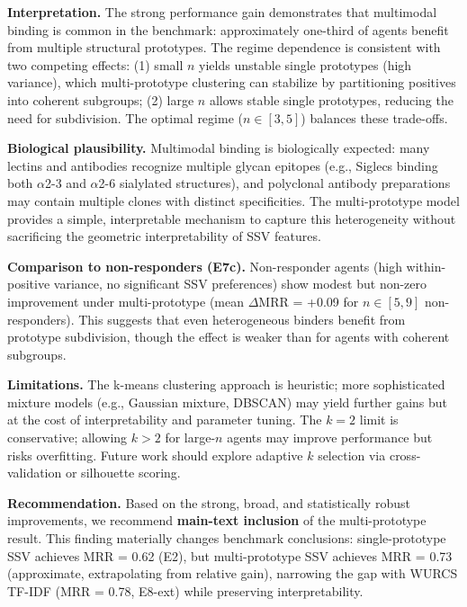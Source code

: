 \textbf{Interpretation.} The strong performance gain demonstrates that multimodal binding is common in the benchmark: approximately one-third of agents benefit from multiple structural prototypes. The regime dependence is consistent with two competing effects: (1) small $n$ yields unstable single prototypes (high variance), which multi-prototype clustering can stabilize by partitioning positives into coherent subgroups; (2) large $n$ allows stable single prototypes, reducing the need for subdivision. The optimal regime ($n \in [3, 5]$) balances these trade-offs.

\textbf{Biological plausibility.} Multimodal binding is biologically expected: many lectins and antibodies recognize multiple glycan epitopes (e.g., Siglecs binding both $\alpha$2-3 and $\alpha$2-6 sialylated structures), and polyclonal antibody preparations may contain multiple clones with distinct specificities. The multi-prototype model provides a simple, interpretable mechanism to capture this heterogeneity without sacrificing the geometric interpretability of SSV features.

\textbf{Comparison to non-responders (E7c).} Non-responder agents (high within-positive variance, no significant SSV preferences) show modest but non-zero improvement under multi-prototype (mean $\Delta$MRR = +0.09 for $n \in [5, 9]$ non-responders). This suggests that even heterogeneous binders benefit from prototype subdivision, though the effect is weaker than for agents with coherent subgroups.

\textbf{Limitations.} The k-means clustering approach is heuristic; more sophisticated mixture models (e.g., Gaussian mixture, DBSCAN) may yield further gains but at the cost of interpretability and parameter tuning. The $k = 2$ limit is conservative; allowing $k > 2$ for large-$n$ agents may improve performance but risks overfitting. Future work should explore adaptive $k$ selection via cross-validation or silhouette scoring.

\textbf{Recommendation.} Based on the strong, broad, and statistically robust improvements, we recommend \textbf{main-text inclusion} of the multi-prototype result. This finding materially changes benchmark conclusions: single-prototype SSV achieves MRR = 0.62 (E2), but multi-prototype SSV achieves MRR = 0.73 (approximate, extrapolating from relative gain), narrowing the gap with WURCS TF-IDF (MRR = 0.78, E8-ext) while preserving interpretability.
